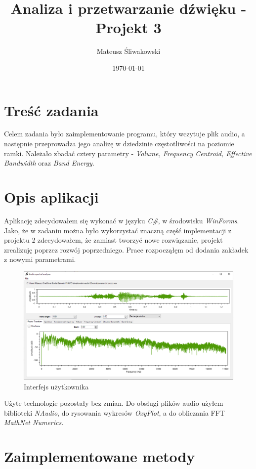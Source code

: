 \documentclass{article}
\title{Analiza i przetwarzanie dźwięku - Projekt 3}
\date{\today}
\author{Mateusz Śliwakowski}
\begin{document}
  \maketitle
  
\section{Treść zadania}
Celem zadania było zaimplementowanie programu, który wczytuje plik audio, a następnie przeprowadza jego analizę w dziedzinie częstotliwości na poziomie ramki. Należało zbadać cztery parametry - \textit{Volume, Frequency Centroid, Effective Bandwidth} oraz \textit{Band Energy}.

\section{Opis aplikacji}

Aplikację zdecydowałem się wykonać w języku \textit{C\#}, w środowisku \textit{WinForms}. Jako, że w zadaniu można było wykorzystać znaczną część implementacji z projektu 2 zdecydowałem, że zamiast tworzyć nowe rozwiązanie, projekt zrealizuję poprzez rozwój poprzedniego. Prace rozpocząłęm od dodania zakładek z nowymi parametrami.

\begin{figure}[H]
\includegraphics[width=6in]{scr1.png}
\centering
\caption{Interfejs użytkownika}
\end{figure}

\noindent Użyte technologie pozostały bez zmian. Do obsługi plików audio użyłem biblioteki \textit{NAudio}, do rysowania wykresów \textit{OxyPlot}, a do obliczania FFT \textit{MathNet Numerics}.

\section{Zaimplementowane metody}
\end{document}
